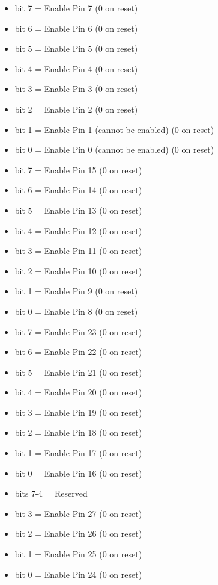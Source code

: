 \begin{itemize}
\item bit 7 = Enable Pin 7 (0 on reset)
\item bit 6 = Enable Pin 6 (0 on reset)
\item bit 5 = Enable Pin 5 (0 on reset)
\item bit 4 = Enable Pin 4 (0 on reset)
\item bit 3 = Enable Pin 3 (0 on reset)
\item bit 2 = Enable Pin 2 (0 on reset)
\item bit 1 = Enable Pin 1 (cannot be enabled) (0 on reset)
\item bit 0 = Enable Pin 0 (cannot be enabled) (0 on reset)
\end{itemize}

\begin{itemize}
\item bit 7 = Enable Pin 15 (0 on reset)
\item bit 6 = Enable Pin 14 (0 on reset)
\item bit 5 = Enable Pin 13 (0 on reset)
\item bit 4 = Enable Pin 12 (0 on reset)
\item bit 3 = Enable Pin 11 (0 on reset)
\item bit 2 = Enable Pin 10 (0 on reset)
\item bit 1 = Enable Pin 9 (0 on reset)
\item bit 0 = Enable Pin 8 (0 on reset)
\end{itemize}

\begin{itemize}
\item bit 7 = Enable Pin 23 (0 on reset)
\item bit 6 = Enable Pin 22 (0 on reset)
\item bit 5 = Enable Pin 21 (0 on reset)
\item bit 4 = Enable Pin 20 (0 on reset)
\item bit 3 = Enable Pin 19 (0 on reset)
\item bit 2 = Enable Pin 18 (0 on reset)
\item bit 1 = Enable Pin 17 (0 on reset)
\item bit 0 = Enable Pin 16 (0 on reset)
\end{itemize}

\begin{itemize}
\item bits 7-4 = Reserved
\item bit 3 = Enable Pin 27 (0 on reset)
\item bit 2 = Enable Pin 26 (0 on reset)
\item bit 1 = Enable Pin 25 (0 on reset)
\item bit 0 = Enable Pin 24 (0 on reset)
\end{itemize}

